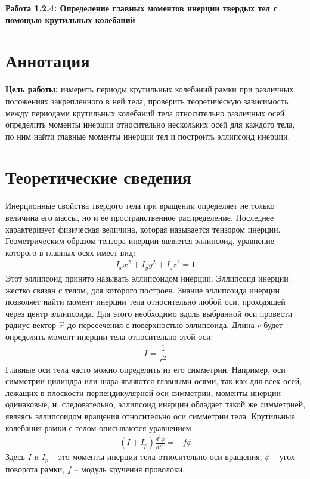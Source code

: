 \begin{center}
   \Large{\textbf{Работа 1.2.4: Определение главных моментов инерции твердых тел с помощью крутильных колебаний}}
\end{center}
\section{Аннотация}
\textbf{Цель работы:}  измерить периоды крутильных колебаний рамки при
различных положениях закрепленного в ней тела, проверить теоретическую зависимость между периодами крутильных колебаний тела
относительно различных осей, определить моменты инерции относительно нескольких осей для каждого тела, по ним найти главные
моменты инерции тел и построить эллипсоид инерции.

\section{Теоретические сведения}
Инерционные свойства твердого тела при вращении определяет не
только величина его массы, но и ее пространственное распределение.
Последнее характеризует физическая величина, которая называется
тензором инерции. Геометрическим образом тензора инерции является эллипсоид,
уравнение которого в главных осях имеет вид: \begin{gather}
   I_x x^2 + I_y y^2 + I_z z^2 = 1
\end{gather}
Этот эллипсоид принято называть эллипсоидом инерции. Эллипсоид
инерции жестко связан с телом, для которого построен. Знание эллипсоида инерции
позволяет найти момент инерции тела относительно любой оси, проходящей через
центр эллипсоида. Для этого необходимо вдоль выбранной оси провести
радиус-вектор $ \vec{r} $ до пересечения с поверхностью эллипсоида. Длина $ r $  будет определять
момент инерции тела относительно этой оси: \begin{gather}
   I = \dfrac{1}{r^2}
\end{gather}
Главные оси тела часто можно определить из
его симметрии. Например, оси симметрии цилиндра или шара являются главными осями, так как
для всех осей, лежащих в плоскости перпендикулярной оси симметрии, моменты инерции одинаковые, и, следовательно, эллипсоид инерции обладает такой же симметрией, являясь эллипсоидом вращения относительно оси симметрии тела.
Крутильные колебания рамки с телом описываются уравнением \begin{gather}
   (I + I_p)\frac{d^2\phi}{dt^2} = - f \phi
\end{gather}
Здесь $ I $ и $ I_p $ -- это моменты инерции тела относительно оси вращения, $ \phi $ -- угол поворота рамки, $ f $ -- модуль кручения проволоки.
